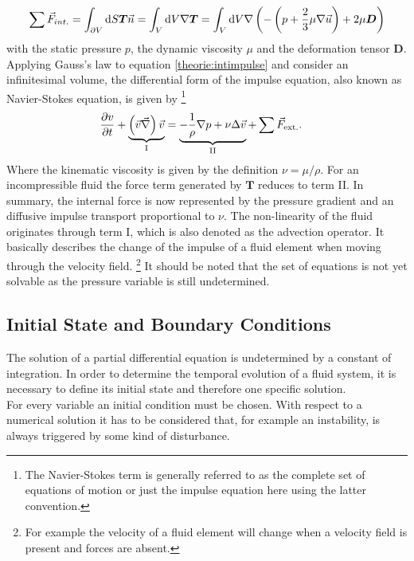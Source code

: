 \begin{align}
    \sum \vec{F}_{int.} = \int_{\partial V}\mathop{}\!\mathrm{d} S \bm{T}\vec{n}  = \int_{V} \mathop{}\!\mathrm{d} V \nabla \bm{T} =
     \int_{V} \mathop{}\!\mathrm{d} V \nabla \left(- \left(p + \frac{2}{3}\mu\nabla\vec{u} \right) + 2\mu \bm{D} \right)
\end{align}
with the static pressure $p$, the dynamic viscosity $\mu$ and the deformation tensor $\bm{D}$.
Applying Gauss's law to equation \ref{theorie:intimpulse} and consider an infinitesimal volume,
the differential form of the impulse equation, also known as Navier-Stokes equation, is given by
\footnote{The Navier-Stokes term is generally referred to as the complete set of equations of motion or
just the impulse equation here using the latter convention.}
\begin{align}
    \label{theorie:eqns}
    \pdn[v]{t} + \underbrace{\left(\vec{v} \vec{\nabla}\right) \vec{v}}_{\text{I}} &= \underbrace{- \frac{1}{\rho} \nabla p + \nu \Delta \vec{v}}_{\text{II}} +\sum \vec{F}_{\text{ext.}}.
\end{align}
Where  the kinematic viscosity is given by the definition $\nu = \mu/\rho$.
For an incompressible fluid the force term generated by $\bm{T}$ reduces to term \RN{2}.
In summary, the internal force is now represented by the pressure gradient and an diffusive impulse transport proportional to $\nu$.
The non-linearity of the fluid originates through term \RN{1}, which is also denoted as the advection operator.
It basically describes the change of the impulse of a fluid element when moving through the velocity field.
\footnote{For example the velocity of a fluid element will change when a velocity field is present and forces are absent.}
It should be noted that the set of equations is not yet solvable as the pressure variable is still undetermined.

\subsection{Initial State and Boundary Conditions}

The solution of a partial differential equation is undetermined by a constant of integration.
In order to determine the temporal evolution of a fluid system, it is necessary to define its initial state and therefore
one specific solution.\\
For every variable an initial condition must be chosen.
With respect to a numerical solution it has to be considered that, for example an instability, is always triggered by some kind of disturbance.

